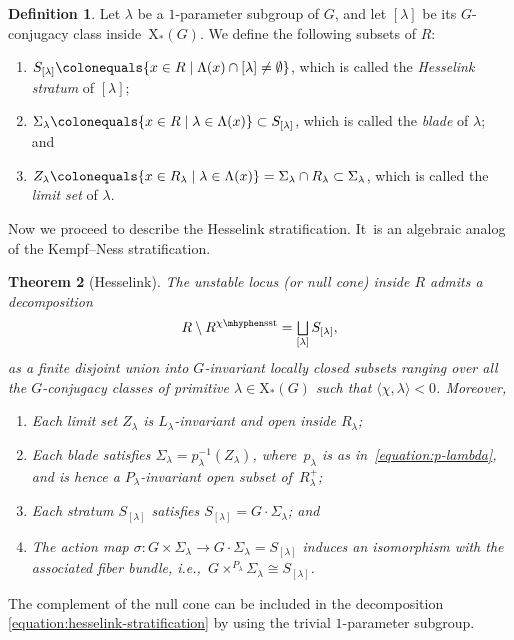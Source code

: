 \documentclass[JEP,XML,SOM,Unicode,NoEqCountersInSection,published]{cedram}
\let\oldbigsqcup\bigsqcup
\renewcommand{\bigsqcup}{\mathop{\textstyle\oldbigsqcup}\displaylimits}
\theoremstyle{plain}
\newtheorem{theorem}{Theorem}[section]
\theoremstyle{definition}
\newtheorem{definition}[theorem]{Definition}
\newcommand\blade[1][]{\Sigma_{#1}}
\newcommand\cocharacters{\ensuremath{\mathrm{X}_*}}
\newcommand\semistable{\ensuremath{\mhyphen\mathrm{sst}}}
\begin{document}
\begin{definition}
Let $\lambda$ be a $1$-parameter subgroup of $G$,
and let $[\lambda]$ be its $G$\nobreakdash-conjugacy class inside~$\cocharacters(G)$.
We define the following subsets of $R$:
\begin{enumerate}
\item $S_{[\lambda]}\colonequals \{ x \in R \mid \Lambda(x) \cap [\lambda] \neq \emptyset \}$,
which is called the \emph{Hesselink stratum} of $[\lambda]$;
\item $\blade[\lambda]\colonequals \{ x \in R \mid \lambda \in \Lambda(x) \}\subset S_{[\lambda]}$,
which is called the \emph{blade} of $\lambda$; and
\item $Z_\lambda\colonequals \{ x \in R_\lambda \mid \lambda \in \Lambda(x)\} = \blade[\lambda] \cap R_\lambda\subset\blade[\lambda]$,
which is called the \emph{limit set} of $\lambda$.
\end{enumerate}
\end{definition}

Now we proceed to describe the Hesselink stratification. It~is an algebraic analog of the Kempf--Ness stratification.

\begin{theorem}[Hesselink]
\label{theorem:hesselink}
The unstable locus (or null cone) inside $R$ admits a decomposition
\begin{equation}
\label{equation:hesselink-stratification}
R\setminus R^{\chi\semistable} = \bigsqcup_{[\lambda]} S_{[\lambda]},
\end{equation}
as a finite disjoint union into $G$-invariant locally closed subsets
ranging over all the $G$-conjugacy classes of primitive $\lambda \in \cocharacters(G)$
such that $\langle \chi,\lambda \rangle < 0$.
Moreover,
\begin{enumerate}
\item Each limit set $Z_\lambda$ is $L_\lambda$-invariant and open inside $R_\lambda$;
\item Each blade satisfies $\blade[\lambda] = p_\lambda^{-1}(Z_\lambda)$,
where~$p_\lambda$ is as in~\eqref{equation:p-lambda},
and is hence a $P_\lambda$\nobreakdash-invari\-ant open subset of~$R_\lambda^+$;
\item Each stratum $S_{[\lambda]}$ satisfies $S_{[\lambda]} = G \cdot \blade[\lambda]$; and
\item The action map $\sigma\colon G\times \blade[\lambda] \to G\cdot \blade[\lambda] = S_{[\lambda]}$
induces an isomorphism with the associated fiber bundle,
i.e.,~$G\times^{P_\lambda} \blade[\lambda] \cong S_{[\lambda]}$.
\end{enumerate}
\end{theorem}
The complement of the null cone can be included in the decomposition \eqref{equation:hesselink-stratification}
by using the trivial $1$-parameter subgroup.
\end{document}
